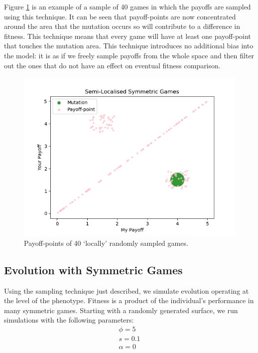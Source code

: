 \documentclass[11pt]{book}
\begin{document}
\noindent Figure \ref{local_symmetric_payoff_plot} is an example of a sample of 40 games in which the payoffs are sampled using this technique.
It can be seen that payoff-points are now concentrated around the area that the mutation occurs so will contribute to a difference in fitness.
This technique means that every game will have at least one payoff-point that touches the mutation area.
This technique introduces no additional bias into the model: it is as if we freely sample payoffs from the whole space and then filter out the ones that do not have an effect on eventual fitness comparison.

\begin{figure}
	\centering
	\includegraphics[scale=0.7]{resources/localised_symmetric_game_mutation.png}
	\caption{Payoff-points of 40 `locally' randomly sampled games.}
	\label{local_symmetric_payoff_plot}
\end{figure}


\subsection{Evolution with Symmetric Games}

Using the sampling technique just described, we simulate evolution operating at the level of the phenotype.
Fitness is a product of the individual's performance in many symmetric games.
Starting with a randomly generated surface, we run simulations with the following parameters:
\begin{gather*}
	\phi = 5\\
	s = 0.1\\
	\alpha = 0\\
\end{gather*}
\end{document}
